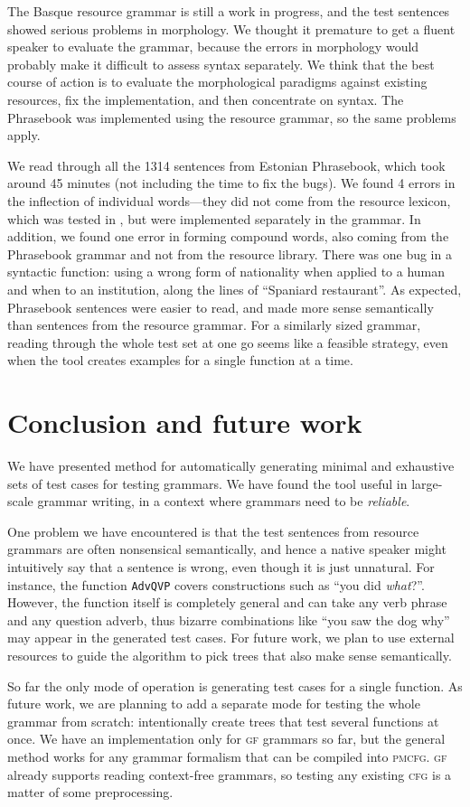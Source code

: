 \documentclass[11pt]{article}
\def\t#1{\texttt{#1}}
\def\gf{\textsc{gf}}
\def\cfg{\textsc{cfg}}
\def\pmcfg{\textsc{pmcfg}}
\begin{document}
The Basque resource grammar is still a work in progress, and the
test sentences showed serious problems in morphology.
We thought it premature to get a fluent speaker to evaluate the grammar,
because the errors in morphology would probably make it
difficult to assess syntax separately. We think that the best course
of action is to evaluate the morphological paradigms against existing
resources, fix the implementation, and then concentrate on syntax.
The Phrasebook was implemented using the resource grammar, so the
same problems apply.

We read through all the 1314 sentences from Estonian Phrasebook,
which took around 45 minutes (not including the time to fix the bugs).
We found 4 errors in the inflection of individual words---they did not
come from the resource lexicon, which was tested in
\cite{listenmaa_kaljurand2014}, but were implemented separately in the
grammar. In addition, we found one error in forming compound words,
also coming from the Phrasebook grammar and not from the resource
library. There was one bug in a syntactic function: using a wrong form
of nationality when applied to a human and when to an institution,
along the lines of ``Spaniard restaurant''. As expected, Phrasebook
sentences were easier to read, and made more sense semantically than
sentences from the resource grammar. For a similarly sized grammar,
reading through the whole test set at one go seems like a feasible
strategy, even when the tool creates examples for a single function at
a time.

\section{Conclusion and future work}

We have presented method for automatically generating minimal and exhaustive sets of test cases for testing grammars.  We have found the tool useful in large-scale grammar writing, in a context where grammars need to be \emph{reliable}.

One problem we have encountered is that the test sentences from
resource grammars are often nonsensical semantically, and hence a
native speaker might intuitively say that a sentence is wrong, even
though it is just unnatural. For instance, the function \t{AdvQVP}
covers constructions such as ``you did \emph{what}?''. However, the
function itself is completely general and can take any verb phrase and
any question adverb, thus  bizarre combinations like ``you saw the dog
why'' may appear in the generated test cases. For future work, we plan
to use external resources to guide the algorithm to pick trees that
also make sense semantically.

So far the only mode of operation is generating test cases for a
single function. As future work, we are planning to add a separate
mode for testing the whole grammar from scratch: intentionally create
trees that test several functions at once.
We have an implementation only for \gf{} grammars so far, but the
general method works for any grammar formalism that can be compiled
into \pmcfg{}. \gf{} already supports reading context-free grammars,
so testing any existing \cfg{} is a matter of some preprocessing. 




\end{document}
